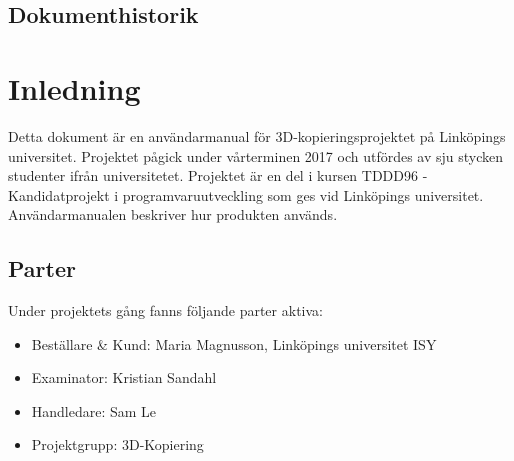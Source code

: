 \documentclass[a4paper,titlepage,12pt]{article}
\begin{document}
\begin{center}

\tableofcontents
\newpage

  \section*{\centering Dokumenthistorik}
  \renewcommand*{\arraystretch}{1.4}
 \centering
{}
\end{center}
\newpage

\section{Inledning}
	Detta dokument är en användarmanual för 3D-kopieringsprojektet på Linköpings universitet. Projektet pågick under vårterminen 2017 och utfördes av sju stycken studenter ifrån universitetet. Projektet är en del i kursen TDDD96 - Kandidatprojekt i programvaruutveckling som ges vid Linköpings universitet. Användarmanualen beskriver hur produkten används.
	\subsection{Parter}
		Under projektets gång fanns följande parter aktiva:
		
		\begin{itemize}
			\item Beställare \& Kund: Maria Magnusson, Linköpings universitet ISY
			\item Examinator: Kristian Sandahl
			\item Handledare: Sam Le
			\item Projektgrupp: 3D-Kopiering
		\end{itemize}
		
\end{document}
